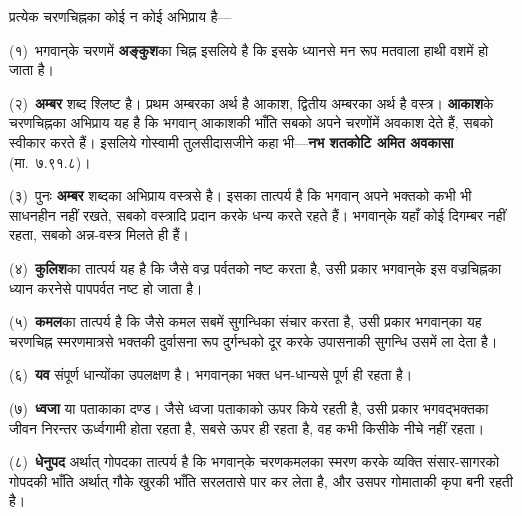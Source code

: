 \begin{sloppypar}\justifying{}
प्रत्येक चरणचिह्नका कोई न कोई अभिप्राय है—
\end{sloppypar}
\begin{sloppypar}\justifying{}
(१)~भगवान्‌के चरणमें \textbf{अङ्कुश}का चिह्न इसलिये है कि इसके ध्यानसे मन रूप मतवाला हाथी वशमें हो जाता है।
\end{sloppypar}
\begin{sloppypar}\justifying{}
(२)~\textbf{अम्बर} शब्द श्लिष्ट है। प्रथम अम्बरका अर्थ है आकाश, द्वितीय अम्बरका अर्थ है वस्त्र। \textbf{आकाश}के चरणचिह्नका अभिप्राय यह है कि भगवान् आकाशकी भाँति सबको अपने चरणोंमें अवकाश देते हैं, सबको स्वीकार करते हैं। इसलिये गोस्वामी तुलसीदासजीने कहा भी—\textbf{नभ शतकोटि अमित अवकासा} (मा.~७.९१.८)।
\end{sloppypar}
\begin{sloppypar}\justifying{}
(३)~पुनः \textbf{अम्बर} शब्दका अभिप्राय वस्त्रसे है। इसका तात्पर्य है कि भगवान् अपने भक्तको कभी भी साधनहीन नहीं रखते, सबको वस्त्रादि प्रदान करके धन्य करते रहते हैं। भगवान्‌के यहाँ कोई दिगम्बर नहीं रहता, सबको अन्न-वस्त्र मिलते ही हैं।
\end{sloppypar}
\begin{sloppypar}\justifying{}
(४)~\textbf{कुलिश}का तात्पर्य यह है कि जैसे वज्र पर्वतको नष्ट करता है, उसी प्रकार भगवान्‌के इस वज्रचिह्नका ध्यान करनेसे पापपर्वत नष्ट हो जाता है।
\end{sloppypar}
\begin{sloppypar}\justifying{}
(५)~\textbf{कमल}का तात्पर्य है कि जैसे कमल सबमें सुगन्धिका संचार करता है, उसी प्रकार भगवान्‌का यह चरणचिह्न स्मरणमात्रसे भक्तकी दुर्वासना रूप दुर्गन्धको दूर करके उपासनाकी सुगन्धि उसमें ला देता है।
\end{sloppypar}
\begin{sloppypar}\justifying{}
(६)~\textbf{यव} संपूर्ण धान्योंका उपलक्षण है। भगवान्‌का भक्त धन-धान्यसे पूर्ण ही रहता है।
\end{sloppypar}
\begin{sloppypar}\justifying{}
(७)~\textbf{ध्वजा} या पताकाका दण्ड। जैसे ध्वजा पताकाको ऊपर किये रहती है, उसी प्रकार भगवद्भक्तका जीवन निरन्तर ऊर्ध्वगामी होता रहता है, सबसे ऊपर ही रहता है, वह कभी किसीके नीचे नहीं रहता।
\end{sloppypar}
\begin{sloppypar}\justifying{}
(८)~\textbf{धेनुपद} अर्थात् गोपदका तात्पर्य है कि भगवान्‌के चरणकमलका स्मरण करके व्यक्ति संसार-सागरको गोपदकी भाँति अर्थात् गौके खुरकी भाँति सरलतासे पार कर लेता है, और उसपर गोमाताकी कृपा बनी रहती है।
\end{sloppypar}
